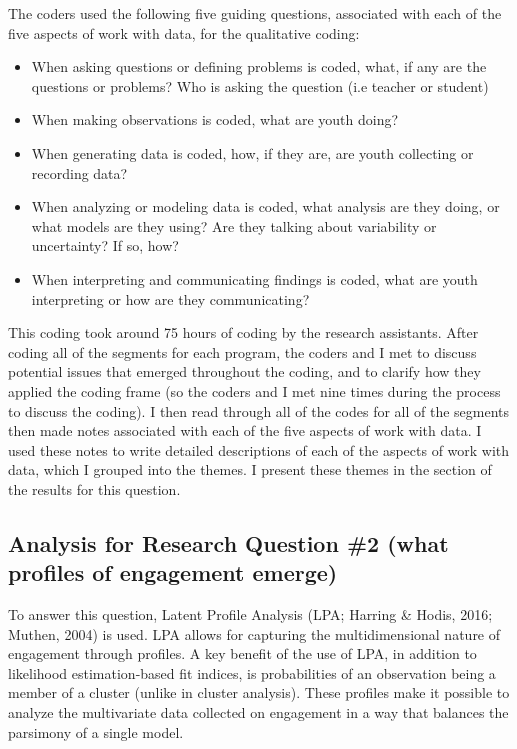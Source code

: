 \documentclass[]{book}
\providecommand{\tightlist}{%
  \setlength{\itemsep}{0pt}\setlength{\parskip}{0pt}}
\theoremstyle{definition}
\theoremstyle{definition}
\theoremstyle{definition}
\theoremstyle{remark}
\begin{document}
The coders used the following five guiding questions, associated with
each of the five aspects of work with data, for the qualitative coding:

\begin{itemize}
\tightlist
\item
  When asking questions or defining problems is coded, what, if any are
  the questions or problems? Who is asking the question (i.e teacher or
  student)
\item
  When making observations is coded, what are youth doing?
\item
  When generating data is coded, how, if they are, are youth collecting
  or recording data?
\item
  When analyzing or modeling data is coded, what analysis are they
  doing, or what models are they using? Are they talking about
  variability or uncertainty? If so, how?
\item
  When interpreting and communicating findings is coded, what are youth
  interpreting or how are they communicating?
\end{itemize}

This coding took around 75 hours of coding by the research assistants.
After coding all of the segments for each program, the coders and I met
to discuss potential issues that emerged throughout the coding, and to
clarify how they applied the coding frame (so the coders and I met nine
times during the process to discuss the coding). I then read through all
of the codes for all of the segments then made notes associated with
each of the five aspects of work with data. I used these notes to write
detailed descriptions of each of the aspects of work with data, which I
grouped into the themes. I present these themes in the section of the
results for this question.

\subsection{Analysis for Research Question \#2 (what profiles of
engagement
emerge)}\label{analysis-for-research-question-2-what-profiles-of-engagement-emerge}

To answer this question, Latent Profile Analysis (LPA; Harring \& Hodis,
2016; Muthen, 2004) is used. LPA allows for capturing the
multidimensional nature of engagement through profiles. A key benefit of
the use of LPA, in addition to likelihood estimation-based fit indices,
is probabilities of an observation being a member of a cluster (unlike
in cluster analysis). These profiles make it possible to analyze the
multivariate data collected on engagement in a way that balances the
parsimony of a single model.
\end{document}
